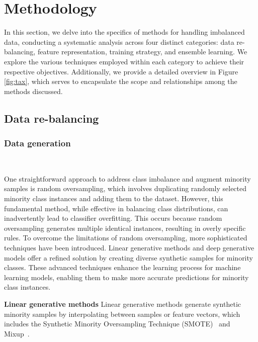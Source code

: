 \section{Methodology}
\label{s3}



In this section, we delve into the specifics of methods for handling imbalanced data, conducting a systematic analysis across four distinct categories: data re-balancing, feature representation, training strategy, and ensemble learning. We explore the various techniques employed within each category to achieve their respective objectives. Additionally, we provide a detailed overview in Figure \ref{fig:tax}, which serves to encapsulate the scope and relationships among the methods discussed.





\subsection{Data re-balancing}
\label{s31}

\subsubsection{Data generation}\
\label{s311}

One straightforward approach to address class imbalance and augment minority samples is random oversampling, which involves duplicating randomly selected minority class instances and adding them to the dataset. However, this fundamental method, while effective in balancing class distributions, can inadvertently lead to classifier overfitting. This occurs because random oversampling generates multiple identical instances, resulting in overly specific rules. To overcome the limitations of random oversampling, more sophisticated techniques have been introduced. Linear generative methods and deep generative models offer a refined solution by creating diverse synthetic samples for minority classes. These advanced techniques enhance the learning process for machine learning models, enabling them to make more accurate predictions for minority class instances.



\textbf{Linear generative methods} 
Linear generative methods generate synthetic minority samples by interpolating between samples or feature vectors, which includes the Synthetic Minority Oversampling Technique (SMOTE)~\cite{ref_2} and Mixup~\cite{zhang2017mixup}.



